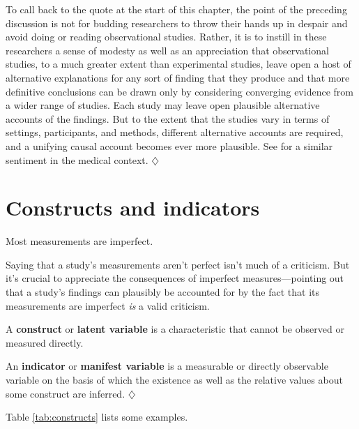 \documentclass[a4paper]{tufte-book}\usepackage[]{graphicx}\usepackage[]{xcolor}
\newcommand{\term}[1]{\textbf{#1}}
\newcommand*{\parend}[1][$\diamondsuit$]{%
  \unskip\nobreak\hspace{1em plus 1fill}$\diamondsuit$%
}
\begin{document}
  To call back to the \citet{Campbell1963} quote at the start of this chapter,
  the point of the preceding discussion is not for budding researchers to 
  throw their hands up in despair and avoid doing or reading observational studies.
  Rather, it is to instill in these researchers a sense of modesty as
  well as an appreciation that
  observational studies, to a much greater extent than experimental studies,
  leave open a host of alternative explanations for any sort of finding that
  they produce and that more definitive conclusions can be drawn only
  by considering converging evidence from a wider range of studies.
  Each study may leave open plausible alternative accounts of the findings.
  But to the extent that the studies vary in terms of settings, participants, and methods,
  different alternative accounts are required, and a unifying causal account becomes
  ever more plausible.
  See \citet{Hill1965} for a similar sentiment in the medical context.
\parend


\chapter{Constructs and indicators}\label{ch:measurementerror}
Most measurements are imperfect.

Saying that a study's measurements aren't perfect isn't much of a criticism.
But it's crucial to appreciate the consequences of imperfect measures---pointing
out that a study's findings can plausibly be accounted for by the fact
that its measurements are imperfect \emph{is} a valid criticism.

  A \term{construct} or \term{latent variable} is a characteristic
  that cannot be observed or measured directly.
  
  An \term{indicator} or \term{manifest variable} is a measurable or
  directly observable variable on the basis of which the existence
  as well as the relative values about some construct are inferred.
\parend

Table \vref{tab:constructs} lists some examples.
  
\end{document}
